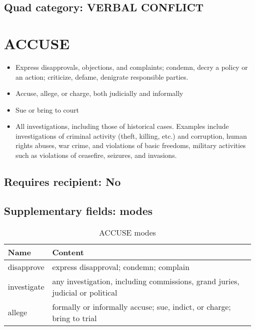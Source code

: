 \documentclass[11pt]{report}
\newcommand{\plcat}[1]{\textsf{#1}}
\begin{document}
 
\subsection{Quad category: VERBAL CONFLICT}

\newpage  


\section{ACCUSE}

\begin{itemize}
	\item Express disapprovals, objections, and complaints; condemn, decry a policy or an action; criticize, defame, denigrate responsible parties.
	\item Accuse, allege, or charge, both judicially and informally
	\item Sue or bring to court
	\item All investigations, including those of historical cases. Examples include investigations of  criminal activity (theft, killing, etc.) and corruption, human rights abuses, war crime, and violations of basic freedoms, military activities such as violations of ceasefire, seizures, and invasions.
\end{itemize}


\subsection{Requires recipient: No}

\subsection{Supplementary fields: modes}

\begin{table}[htp]
\caption{\plcat{ACCUSE} modes}
\begin{center}
\begin{tabular}{|l|p{13cm}|}
\hline
Name & Content \\
\hline
disapprove & express disapproval; condemn; complain\\
investigate & any investigation, including commissions, grand juries, judicial or political\\
allege & formally or informally accuse; sue, indict, or charge; bring to trial\\
\hline
\end{tabular}
\end{center}
\label{tab:accusemode}
\end{table}%
\end{document}
